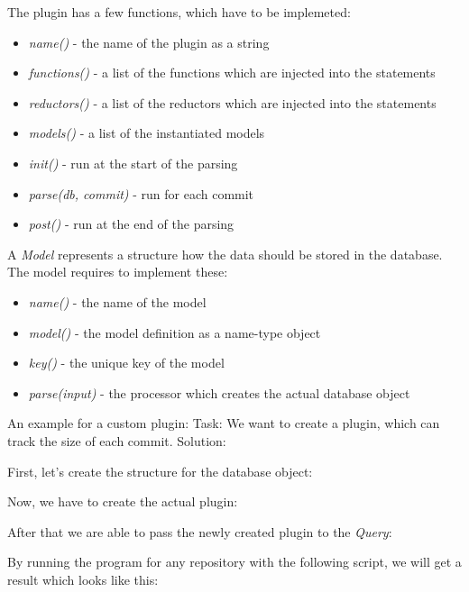 The plugin has a few functions, which have to be implemeted:
\begin{itemize}
	\item \textit{name()} - the name of the plugin as a string
	\item \textit{functions()} - a list of the functions which are injected into the statements
	\item \textit{reductors()} - a list of the reductors which are injected into the statements
	\item \textit{models()} - a list of the instantiated models
 
	\item \textit{init()} - run at the start of the parsing
	\item \textit{parse(db, commit)} - run for each commit
	\item \textit{post()} - run at the end of the parsing
\end{itemize}

A \textit{Model} represents a structure how the data should be stored in the database.
The model requires to implement these:
\begin{itemize}
	\item \textit{name()} - the name of the model
	\item \textit{model()} - the model definition as a name-type object 
	\item \textit{key()} - the unique key of the model
	\item \textit{parse(input)} - the processor which creates the actual database object
\end{itemize}

An example for a custom plugin:\newline
Task: We want to create a plugin, which can track the size of each commit. 
Solution:\newline

First, let's create the structure for the database object:


Now, we have to create the actual plugin:


After that we are able to pass the newly created plugin to the \textit{Query}:


By running the program for any repository with the following script, we will get a result which looks like this:




